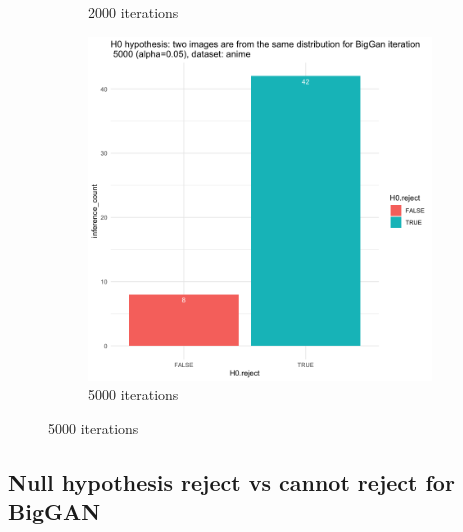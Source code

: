 \documentclass{article}
\begin{document}
\begin{figure}[h!]
\begin{subfigure}[b]{0.3\textwidth}
         \caption{2000 iterations}
     \end{subfigure}
     \hfill
     \begin{subfigure}[b]{0.3\textwidth}
         \centering
         \includegraphics[width=\textwidth]{kmmd_figures/biggan_anime_5000.png}
         \caption{5000 iterations}
     \end{subfigure}
\end{figure}

\newpage
\subsection*{Null hypothesis reject vs cannot reject for BigGAN}
\end{document}
